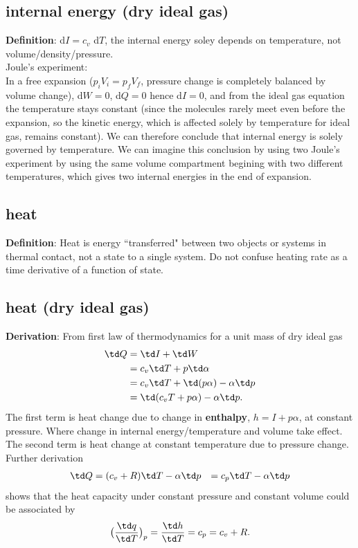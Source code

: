 \subsection{internal energy (dry ideal gas)}
{\bf{Definition}}: d$I = c_v$ d$T$, the internal energy soley depends on temperature, not
volume/density/pressure. \\

{Joule's experiment:} \\
In a free expansion ($p_iV_i = p_fV_f$, pressure change is completely balanced by volume change),
d$W = 0$, d$Q = 0$ hence d$I = 0$, and from the ideal gas equation the temperature stays constant
(since the molecules rarely meet even before the expansion, so the kinetic energy, which is affected
solely by temperature for ideal gas, remains constant). We can therefore conclude that internal
energy is solely governed by temperature. We can imagine this conclusion by using two Joule's
experiment by using the same volume compartment begining with two different temperatures, which
gives two internal energies in the end of expansion. 


\subsection{heat}
{\bf{Definition}}: Heat is energy ``transferred" between two objects or systems in thermal contact, not
a state to a single system. Do not confuse heating rate as a time derivative of a function of state.


\subsection{heat (dry ideal gas)}
{\bf{Derivation}}: From first law of thermodynamics for a unit mass of dry ideal gas
\begin{equation} \label{eq:energy_cv}
\begin{aligned}
  \td Q & = \td I + \td W \\
        & = c_v \td T + p \td \alpha \\
        & = c_v \td T + \td(p\alpha) - \alpha \td p \\
        & = \td (c_v T + p\alpha) - \alpha \td p. 
\end{aligned}
\end{equation}
The first term is heat change due to change in {\bf{enthalpy}}, $h = I + p\alpha$, at constant
pressure. Where change in internal energy/temperature and volume take effect. The second
term is heat change at constant temperature due to pressure change. Further derivation 
\begin{equation} \label{eq:energy_cp}
\begin{aligned}
  \td Q & = (c_v + R) \td T - \alpha \td p
        & = c_p \td T - \alpha \td p
\end{aligned}
\end{equation}
shows that the heat capacity under constant pressure and constant volume could be associated by
\begin{equation}
  \big( \frac{\td q}{\td T} \big)_p = \frac{\td h}{\td T} =  c_p = c_v + R.
\end{equation}

